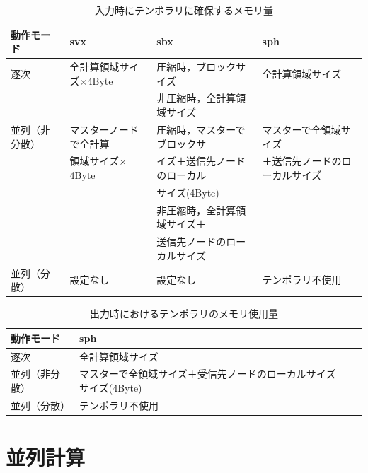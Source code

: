 \begin{table}[htdp]
\caption{入力時にテンポラリに確保するメモリ量}
\begin{center}
\small
\begin{tabular}{llll} \toprule
動作モード    & svx                           & sbx                      & sph\\ \midrule
逐次         & 全計算領域サイズ$\times$4Byte   & 圧縮時，ブロックサイズ      & 全計算領域サイズ\\
             &                              & 非圧縮時，全計算領域サイズ   & \\
並列（非分散） & マスターノードで全計算          & 圧縮時，マスターでブロックサ  & マスターで全領域サイズ \\
             & 領域サイズ$\times$4Byte       & イズ＋送信先ノードのローカル  & ＋送信先ノードのローカルサイズ\\
             &                              & サイズ(4Byte)              & \\
             &                              & 非圧縮時，全計算領域サイズ＋  & \\ 
             &                              & 送信先ノードのローカルサイズ  & \\ 
並列（分散）   & 設定なし                      & 設定なし                   & テンポラリ不使用 \\ \bottomrule
\end{tabular}
\end{center}
\label{tbl:temporary_in}
\end{table}

\begin{table}[htdp]
\caption{出力時におけるテンポラリのメモリ使用量}
\begin{center}
\small
\begin{tabular}{llll} \toprule
動作モード   & sph\\ \midrule
逐次        & 全計算領域サイズ\\
並列（非分散）& マスターで全領域サイズ＋受信先ノードのローカルサイズサイズ(4Byte)\\
並列（分散）  & テンポラリ不使用 \\ \bottomrule
\end{tabular}
\end{center}
\label{tbl:temporary_out}
\end{table}

%
\pagebreak
\section{並列計算}
\label{sec:parallel_exec}

